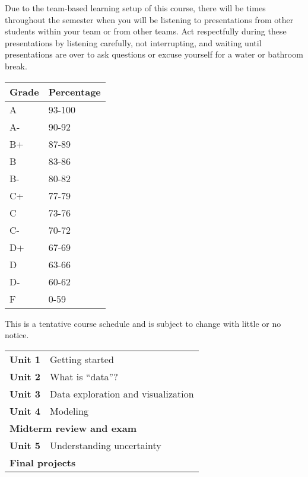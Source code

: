 \documentclass[10pt]{article}
\begin{document}
 Due to the team-based learning setup of this course, there will be times throughout the semester when you will be listening to presentations from other students within your team or from other teams. Act respectfully during these presentations by listening carefully, not interrupting, and waiting until presentations are over to ask questions or excuse yourself for a water or bathroom break.\\

%  
%  
\begin{table}[htp]
\begin{tabular}{ll}
Grade & Percentage \\
\hline
A & 93-100 \\
A- & 90-92 \\
B+ & 87-89 \\
B & 83-86 \\
B- & 80-82 \\
C+ & 77-79 \\
C & 73-76 \\
C- & 70-72 \\
D+ & 67-69 \\
D & 63-66 \\
D- & 60-62\\
F & 0-59 \\
\end{tabular}
\end{table}%

\bigskip
{}

\noindent This is a tentative course schedule and is subject to change with little or no notice.

\begin{table}[htp]
\begin{tabular}{ll}
\bf Unit 1  & Getting started \\
\bf Unit 2 & What is ``data''?\\
\bf Unit 3 & Data exploration and visualization\\
\bf Unit 4 & Modeling\\
\multicolumn{2}{l}{\bf Midterm review and exam}\\
\bf Unit 5 & Understanding uncertainty  \\
\multicolumn{2}{l}{\bf Final projects}
\end{tabular}
\end{table}%
\end{document}
